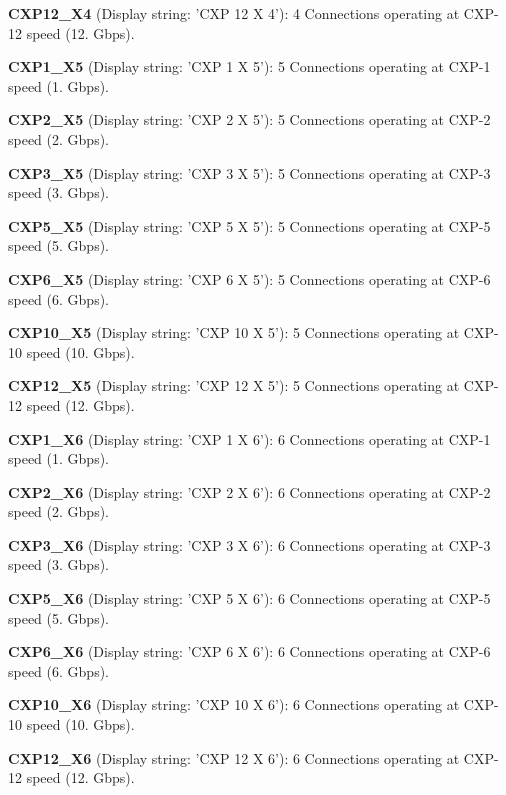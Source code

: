 \begin{DoxyItemize}
\item {\bfseries C\+X\+P12\+\_\+\+X4} (Display string\+: 'C\+X\+P 12 X 4')\+: 4 Connections operating at C\+X\+P-\/12 speed (12. Gbps).
\item {\bfseries C\+X\+P1\+\_\+\+X5} (Display string\+: 'C\+X\+P 1 X 5')\+: 5 Connections operating at C\+X\+P-\/1 speed (1. Gbps).
\item {\bfseries C\+X\+P2\+\_\+\+X5} (Display string\+: 'C\+X\+P 2 X 5')\+: 5 Connections operating at C\+X\+P-\/2 speed (2. Gbps).
\item {\bfseries C\+X\+P3\+\_\+\+X5} (Display string\+: 'C\+X\+P 3 X 5')\+: 5 Connections operating at C\+X\+P-\/3 speed (3. Gbps).
\item {\bfseries C\+X\+P5\+\_\+\+X5} (Display string\+: 'C\+X\+P 5 X 5')\+: 5 Connections operating at C\+X\+P-\/5 speed (5. Gbps).
\item {\bfseries C\+X\+P6\+\_\+\+X5} (Display string\+: 'C\+X\+P 6 X 5')\+: 5 Connections operating at C\+X\+P-\/6 speed (6. Gbps).
\item {\bfseries C\+X\+P10\+\_\+\+X5} (Display string\+: 'C\+X\+P 10 X 5')\+: 5 Connections operating at C\+X\+P-\/10 speed (10. Gbps).
\item {\bfseries C\+X\+P12\+\_\+\+X5} (Display string\+: 'C\+X\+P 12 X 5')\+: 5 Connections operating at C\+X\+P-\/12 speed (12. Gbps).
\item {\bfseries C\+X\+P1\+\_\+\+X6} (Display string\+: 'C\+X\+P 1 X 6')\+: 6 Connections operating at C\+X\+P-\/1 speed (1. Gbps).
\item {\bfseries C\+X\+P2\+\_\+\+X6} (Display string\+: 'C\+X\+P 2 X 6')\+: 6 Connections operating at C\+X\+P-\/2 speed (2. Gbps).
\item {\bfseries C\+X\+P3\+\_\+\+X6} (Display string\+: 'C\+X\+P 3 X 6')\+: 6 Connections operating at C\+X\+P-\/3 speed (3. Gbps).
\item {\bfseries C\+X\+P5\+\_\+\+X6} (Display string\+: 'C\+X\+P 5 X 6')\+: 6 Connections operating at C\+X\+P-\/5 speed (5. Gbps).
\item {\bfseries C\+X\+P6\+\_\+\+X6} (Display string\+: 'C\+X\+P 6 X 6')\+: 6 Connections operating at C\+X\+P-\/6 speed (6. Gbps).
\item {\bfseries C\+X\+P10\+\_\+\+X6} (Display string\+: 'C\+X\+P 10 X 6')\+: 6 Connections operating at C\+X\+P-\/10 speed (10. Gbps).
\item {\bfseries C\+X\+P12\+\_\+\+X6} (Display string\+: 'C\+X\+P 12 X 6')\+: 6 Connections operating at C\+X\+P-\/12 speed (12. Gbps).
\end{DoxyItemize}

